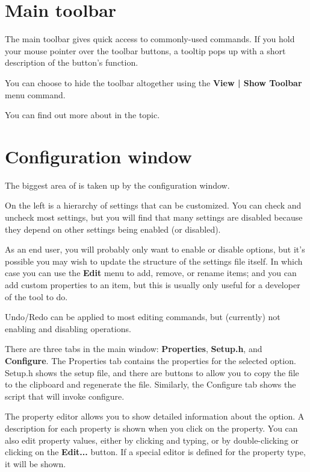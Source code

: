 \section{Main toolbar}


The main toolbar gives quick access to commonly-used commands.
If you hold your mouse pointer over the toolbar buttons, a tooltip pops up with a short description
of the button's function.

You can choose to hide the toolbar altogether
using the {\bf View | Show Toolbar} menu command.

You can find out more about in the  topic.

\section{Configuration window}


The biggest area of \ctshortname is taken up by the configuration window.

On the left is a hierarchy of settings that can be customized.
You can check and uncheck most settings, but you will find that
many settings are disabled because they depend on other settings
being enabled (or disabled).

As an end user, you will probably only want to enable or disable
options, but it's possible you may wish to update the structure
of the settings file itself. In which case you can use the
{\bf Edit} menu to add, remove, or rename items; and you can
add custom properties to an item, but this is usually only
useful for a developer of the tool to do.

Undo/Redo can be applied to most editing commands, but (currently) not
enabling and disabling operations.

There are three tabs in the main window: {\bf Properties}, {\bf Setup.h},
and {\bf Configure}. The Properties tab contains the properties
for the selected option. Setup.h shows the setup file,
and there are buttons to allow you to copy the file to the clipboard
and regenerate the file. Similarly, the Configure tab shows
the script that will invoke configure.

The property editor allows you to show detailed information
about the option. A description for each property is shown
when you click on the property. You can also edit property values,
either by clicking and typing, or by double-clicking or clicking
on the {\bf Edit...} button. If a special editor is defined for
the property type, it will be shown.

